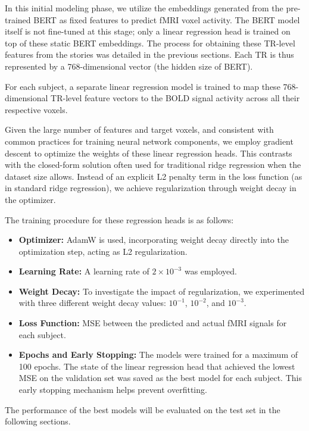 \documentclass[10pt,letterpaper]{article}
\begin{document}
In this initial modeling phase, we utilize the embeddings generated from the pre-trained BERT as fixed features to predict fMRI voxel activity. The BERT model itself is not fine-tuned at this stage; only a linear regression head is trained on top of these static BERT embeddings. The process for obtaining these TR-level features from the stories was detailed in the previous sections. Each TR is thus represented by a 768-dimensional vector (the hidden size of BERT).

For each subject, a separate linear regression model is trained to map these 768-dimensional TR-level feature vectors to the BOLD signal activity across all their respective voxels.

Given the large number of features and target voxels, and consistent with common practices for training neural network components, we employ gradient descent to optimize the weights of these linear regression heads. This contrasts with the closed-form solution often used for traditional ridge regression when the dataset size allows. Instead of an explicit L2 penalty term in the loss function (as in standard ridge regression), we achieve regularization through weight decay in the optimizer.

The training procedure for these regression heads is as follows:
\begin{itemize}
    \item \textbf{Optimizer:} AdamW \cite{loshchilov2017decoupled} is used, incorporating weight decay directly into the optimization step, acting as L2 regularization.
    \item \textbf{Learning Rate:} A learning rate of $2 \times 10^{-3}$ was employed.
    \item \textbf{Weight Decay:} To investigate the impact of regularization, we experimented with three different weight decay values: $10^{-1}$, $10^{-2}$, and $10^{-3}$.
    \item \textbf{Loss Function:} MSE between the predicted and actual fMRI signals for each subject.
    \item \textbf{Epochs and Early Stopping:} The models were trained for a maximum of 100 epochs. The state of the linear regression head that achieved the lowest MSE on the validation set was saved as the best model for each subject. This early stopping mechanism helps prevent overfitting.
\end{itemize}

The performance of the best models will be evaluated on the test set in the following sections.
\end{document}
